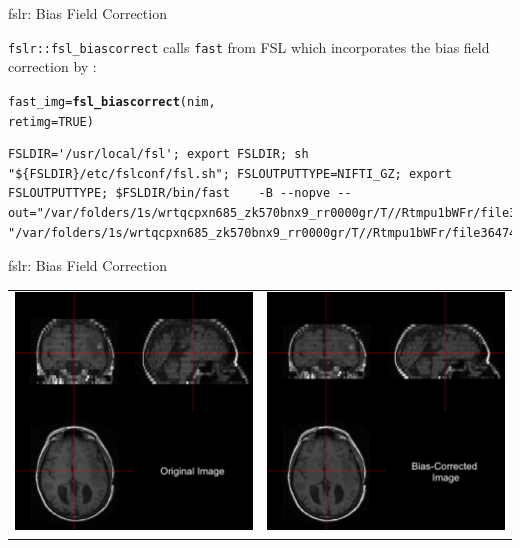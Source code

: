 \documentclass[11pt]{beamer}\usepackage[]{graphicx}\usepackage[]{color}
\makeatletter
\newcommand{\hlnum}[1]{\textcolor[rgb]{0.686,0.059,0.569}{#1}}%
\newcommand{\hlstd}[1]{\textcolor[rgb]{0.345,0.345,0.345}{#1}}%
\newcommand{\hlkwb}[1]{\textcolor[rgb]{0.69,0.353,0.396}{#1}}%
\newcommand{\hlkwc}[1]{\textcolor[rgb]{0.333,0.667,0.333}{#1}}%
\newcommand{\hlkwd}[1]{\textcolor[rgb]{0.737,0.353,0.396}{\textbf{#1}}}%
\newenvironment{kframe}{%
 \def\at@end@of@kframe{}%
 \ifinner\ifhmode%
  \def\at@end@of@kframe{\end{minipage}}%
  \begin{minipage}{\columnwidth}%
 \fi\fi%
 \def\FrameCommand##1{\hskip\@totalleftmargin \hskip-\fboxsep
 \colorbox{shadecolor}{##1}\hskip-\fboxsep
     \hskip-\linewidth \hskip-\@totalleftmargin \hskip\columnwidth}%
 \MakeFramed {\advance\hsize-\width
   \@totalleftmargin\z@ \linewidth\hsize
   \@setminipage}}%
 {\par\unskip\endMakeFramed%
 \at@end@of@kframe}
\newenvironment{knitrout}{}{} %
\makeatother
\begin{document}
\begin{frame}[fragile]{fslr: Bias Field Correction}

\verb|fslr::fsl_biascorrect| calls \verb|fast| from FSL which incorporates the bias field correction by \citet{guillemaud1997estimating}:

\begin{knitrout}
\color{fgcolor}\begin{kframe}
\begin{alltt}
\hlstd{fast_img} \hlkwb{=} \hlkwd{fsl_biascorrect}\hlstd{(nim,}
        \hlkwc{retimg}\hlstd{=}\hlnum{TRUE}\hlstd{)}
\end{alltt}
\begin{verbatim}
FSLDIR='/usr/local/fsl'; export FSLDIR; sh "${FSLDIR}/etc/fslconf/fsl.sh"; FSLOUTPUTTYPE=NIFTI_GZ; export FSLOUTPUTTYPE; $FSLDIR/bin/fast    -B --nopve --out="/var/folders/1s/wrtqcpxn685_zk570bnx9_rr0000gr/T//Rtmpu1bWFr/file36472b611ed9" "/var/folders/1s/wrtqcpxn685_zk570bnx9_rr0000gr/T//Rtmpu1bWFr/file3647404bb909.nii.gz"; 
\end{verbatim}
\end{kframe}
\end{knitrout}
\end{frame}



\begin{frame}[fragile]{fslr: Bias Field Correction}

\begin{tabular}{cc}
\includegraphics[width=0.5\linewidth]{Orig_Image.png} & \includegraphics[width=0.5\linewidth]{FAST_Image.png}
\end{tabular}

\end{frame}
\end{document}
